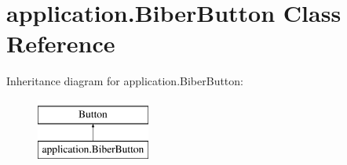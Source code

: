\hypertarget{classapplication_1_1_biber_button}{}\section{application.\+Biber\+Button Class Reference}
\label{classapplication_1_1_biber_button}
Inheritance diagram for application.\+Biber\+Button\+:\begin{figure}[H]
\begin{center}
\leavevmode
\includegraphics[height=2.000000cm]{classapplication_1_1_biber_button}
\end{center}
\end{figure}
